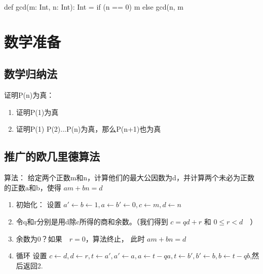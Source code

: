 \begin{Scala}

    def gcd(m: Int, n: Int): Int =
      if (n == 0)
        m
      else gcd(n, m %
      
\end{Scala}

\section{数学准备}

\subsection{数学归纳法}

证明P(n)为真：
\begin{enumerate}
\item 证明P(1)为真
\item 证明P(1) P(2)...P(n)为真，那么P(n+1)也为真
\end{enumerate}

\subsection{推广的欧几里德算法}

算法： 给定两个正数m和n，计算他们的最大公因数为d，并计算两个未必为正数的正数a和b，使得 \( am + bn = d \)

\begin{enumerate}
\item 初始化： 设置 \( a' \leftarrow b \leftarrow 1, a \leftarrow b' \leftarrow 0, c \leftarrow m, d \leftarrow n \)

\item 令q和r分别是用d除c所得的商和余数。（我们得到 \( c = qd + r　\) 和 \( 0 \le r < d \)　）

\item 余数为0？如果　\( r = 0 \)，算法终止， 此时 \( am + bn = d \)

\item 循环 设置 \( c \leftarrow d, d \leftarrow r,  t \leftarrow a', a' \leftarrow a, a \leftarrow t - qa, t \leftarrow b', b' \leftarrow b, b \leftarrow t - qb \),然后返回2.
\end{enumerate}